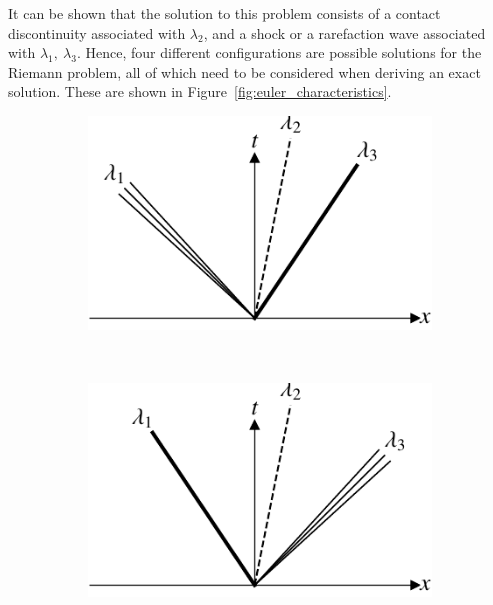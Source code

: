 It can be shown that the solution to this problem consists of a contact discontinuity associated with $\lambda_2$, and a shock or a rarefaction wave associated with $\lambda_1,~\lambda_3$. Hence, four different configurations are possible solutions for the Riemann problem, all of which need to be considered when deriving an exact solution. These are shown in Figure~\ref{fig:euler_characteristics}.
\begin{figure}[htb]
	\centering
	\begin{subfigure}[b]{0.35\linewidth}
		\includegraphics[width=\linewidth]{Pictures/euler_characteristics_0.pdf}
		\caption{}
	\end{subfigure}~
	\begin{subfigure}[b]{0.35\linewidth}
		\includegraphics[width=\linewidth]{Pictures/euler_characteristics_1.pdf}
		\caption{}
	\end{subfigure} \\
	\begin{subfigure}[b]{0.35\linewidth}

\end{subfigure}
\end{figure}
